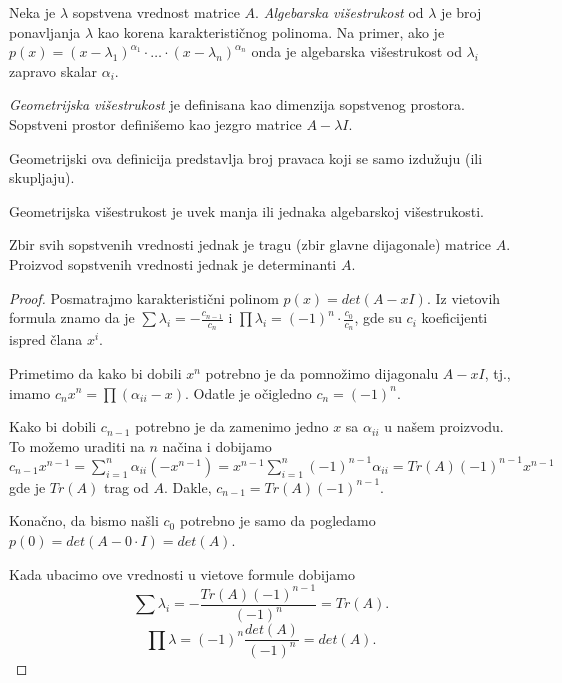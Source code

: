 \documentclass{article}
\begin{document}
\begin{definition}
  Neka je $\lambda$ sopstvena vrednost matrice $A$.
  \textit{Algebarska višestrukost} od $\lambda$ je broj ponavljanja $\lambda$ kao korena karakterističnog polinoma.
  Na primer, ako je $p(x) = (x - \lambda_1)^{\alpha_1} \cdot \ldots \cdot (x - \lambda_n)^{\alpha_n}$ onda je algebarska višestrukost od $\lambda_i$ zapravo skalar $\alpha_i$.
\end{definition}

\begin{definition}
  \textit{Geometrijska višestrukost} je definisana kao dimenzija sopstvenog prostora.
  Sopstveni prostor definišemo kao jezgro matrice $A - \lambda I$.
\end{definition}

Geometrijski ova definicija predstavlja broj pravaca koji se samo izdužuju (ili skupljaju).

\begin{theorem}
  Geometrijska višestrukost je uvek manja ili jednaka algebarskoj višestrukosti.
\end{theorem}

\begin{theorem}
  Zbir svih sopstvenih vrednosti jednak je tragu (zbir glavne dijagonale) matrice $A$.
  Proizvod sopstvenih vrednosti jednak je determinanti $A$.
\end{theorem}

\begin{proof}
  Posmatrajmo karakteristični polinom $p(x) = det(A - x I)$.
  Iz vietovih formula znamo da je $\sum \lambda_i = -\frac{c_{n - 1}}{c_n}$ i $\prod \lambda_i = (-1)^n \cdot \frac{c_0}{c_n}$, gde su $c_i$ koeficijenti ispred člana $x^i$.

  Primetimo da kako bi dobili $x^n$ potrebno je da pomnožimo dijagonalu $A - x I$, tj., imamo $c_n x^n = \prod (\alpha_{ii} - x)$.
  Odatle je očigledno $c_n = (-1)^n$.

  Kako bi dobili $c_{n - 1}$ potrebno je da zamenimo jedno $x$ sa $\alpha_{ii}$ u našem proizvodu.
  To možemo uraditi na $n$ načina i dobijamo $c_{n - 1} x^{n - 1} = \sum_{i = 1}^{n} \alpha_{ii} (-x^{n - 1}) = x^{n - 1} \sum_{i = 1}^{n} (-1)^{n - 1} \alpha_{ii} = Tr(A) (-1)^{n - 1} x^{n - 1}$ gde je $Tr(A)$ trag od $A$.
  Dakle, $c_{n - 1} = Tr(A) (-1)^{n - 1}$.

  Konačno, da bismo našli $c_0$ potrebno je samo da pogledamo $p(0) = det(A - 0 \cdot I) = det(A)$.

  Kada ubacimo ove vrednosti u vietove formule dobijamo
  \[\sum \lambda_i = -\frac{Tr(A) (-1)^{n - 1}}{(-1)^n} = Tr(A).\]
  \[\prod \lambda = (-1)^n \frac{det(A)}{(-1)^n} = det(A).\]
\end{proof}
\end{document}

